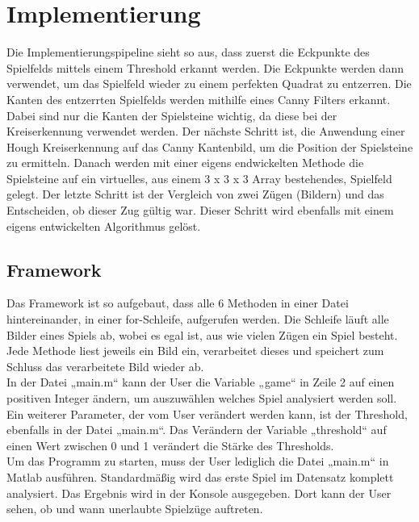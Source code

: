 \documentclass[paper=A4, deutsch]{scrartcl}
\begin{document}
\section{Implementierung}
Die Implementierungspipeline sieht so aus, dass zuerst die Eckpunkte des Spielfelds mittels  einem Threshold erkannt werden. Die Eckpunkte werden dann verwendet, um das Spielfeld wieder zu einem perfekten Quadrat zu entzerren. Die Kanten des entzerrten Spielfelds werden mithilfe eines Canny Filters erkannt. Dabei sind nur die Kanten der Spielsteine wichtig, da diese bei der Kreiserkennung verwendet werden. Der nächste Schritt ist, die Anwendung einer Hough Kreiserkennung auf das Canny Kantenbild, um die Position der Spielsteine zu ermitteln. Danach werden mit einer eigens endwickelten Methode die Spielsteine auf ein virtuelles, aus einem 3 x 3 x 3 Array bestehendes, Spielfeld gelegt. Der letzte Schritt ist der Vergleich von zwei Zügen (Bildern) und das Entscheiden, ob dieser Zug gültig war. Dieser Schritt wird ebenfalls mit einem eigens entwickelten Algorithmus gelöst.

\subsection{Framework}
Das Framework ist so aufgebaut, dass alle 6 Methoden in einer Datei hintereinander, in einer for-Schleife, aufgerufen werden. Die Schleife läuft alle Bilder eines Spiels ab, wobei es egal ist, aus wie vielen Zügen ein Spiel besteht. Jede Methode liest jeweils ein Bild ein, verarbeitet dieses und speichert zum Schluss das verarbeitete Bild wieder ab.\\
In der Datei „main.m“ kann der User die Variable „game“ in Zeile 2 auf einen positiven Integer ändern, um auszuwählen welches Spiel analysiert werden soll. Ein weiterer Parameter, der vom User verändert werden kann, ist der Threshold, ebenfalls in der Datei „main.m“. Das Verändern der Variable „threshold“ auf einen Wert zwischen 0 und 1 verändert die Stärke des Thresholds.\\
Um das Programm zu starten, muss der User lediglich die Datei „main.m“ in Matlab ausführen. Standardmäßig wird das erste Spiel im Datensatz komplett analysiert. Das Ergebnis wird in der Konsole ausgegeben. Dort kann der User sehen, ob und wann unerlaubte Spielzüge auftreten.\\
\end{document}
